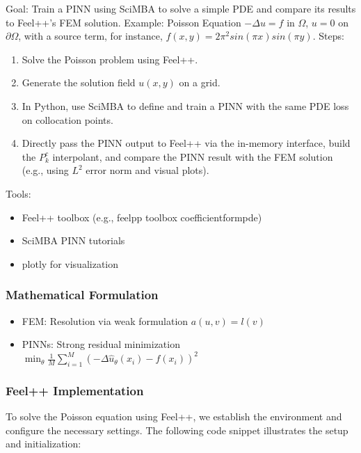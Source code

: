 \documentclass{article}
\begin{document}
Goal: Train a PINN using SciMBA to solve a simple PDE and compare its results to Feel++'s FEM solution. Example: Poisson Equation $-\Delta u=f$ in $\Omega$, $u=0$ on $\partial\Omega$, with a source term, for instance, $f(x,y)=2\pi^{2}sin(\pi x)sin(\pi y)$. Steps:

\begin{enumerate}
\item Solve the Poisson problem using Feel++.
\item Generate the solution field $u(x,y)$ on a grid.
\item In Python, use SciMBA to define and train a PINN with the same PDE loss on collocation points.
\item Directly pass the PINN output to Feel++ via the in-memory interface, build the $P_{k}^{c}$ interpolant, and compare the PINN result with the FEM solution (e.g., using $L^{2}$ error norm and visual plots).
\end{enumerate}

Tools:

\begin{itemize}
\item Feel++ toolbox (e.g., feelpp toolbox coefficientformpde)
\item SciMBA PINN tutorials
\item plotly for visualization
\end{itemize}

\subsubsection{Mathematical Formulation}

\begin{itemize}
\item FEM: Resolution via weak formulation $a(u,v)=l(v)$
\item PINNs: Strong residual minimization $\min_{\theta} \frac{1}{M}\sum_{i=1}^{M}(-\Delta\hat{u}_{\theta}(x_{i})-f(x_{i}))^{2}$
\end{itemize}

\subsubsection{Feel++ Implementation}

To solve the Poisson equation using Feel++, we establish the environment and configure the necessary settings. The following code snippet illustrates the setup and initialization:
\end{document}
